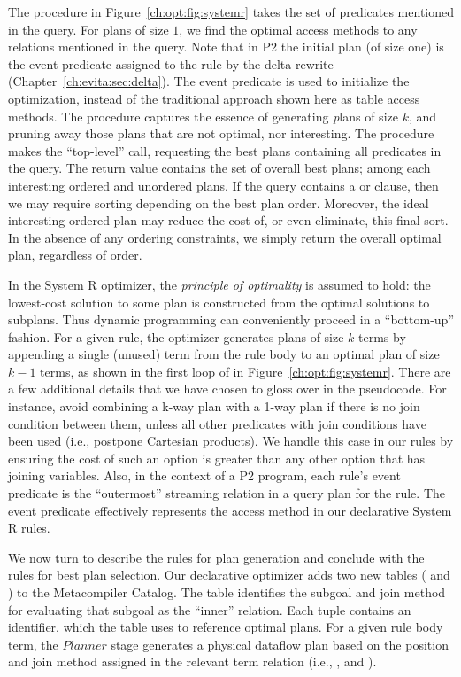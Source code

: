 The  procedure in Figure~\ref{ch:opt:fig:systemr} takes the set of
predicates mentioned in the query.  For plans of size $1$, we find the optimal
access methods to any relations mentioned in the query.  Note that in P2 the
initial plan (of size one) is the event predicate assigned to the rule by the
delta rewrite (Chapter~\ref{ch:evita:sec:delta}).  The event predicate is used
to initialize the optimization, instead of the traditional approach shown here
as table access methods.  The  procedure captures the essence of
generating {\emph plans} of size $k$, and pruning away those plans that are not
optimal, nor interesting.  The  procedure makes the ``top-level''
call, requesting the best plans containing all predicates in the query.  The
return value contains the set of overall best plans; among each interesting
ordered and unordered plans.  If the query contains a  or
 clause, then we may require sorting depending on the best plan
order.  Moreover, the ideal interesting ordered plan may reduce the cost of, or
even eliminate, this final sort.  In the absence of any ordering constraints,
we simply return the overall optimal plan, regardless of order.

In the System R optimizer, the {\em principle of optimality} is assumed to
hold: the lowest-cost solution to some plan is constructed from the optimal
solutions to subplans.  Thus dynamic programming can conveniently proceed in a
``bottom-up'' fashion.  For a given rule, the optimizer generates plans of size
$k$ terms by appending a single (unused) term from the rule body to an optimal
plan of size $k-1$ terms, as shown in the first loop of  in
Figure~\ref{ch:opt:fig:systemr}.  There are a few additional details that we
have chosen to gloss over in the pseudocode.  For instance, avoid combining a
k-way plan with a 1-way plan if there is no join condition between them, unless
all other predicates with join conditions have been used (i.e., postpone
Cartesian products).  We handle this case in our \OVERLOG rules by ensuring the
cost of such an option is greater than any other option that has joining
variables.  Also, in the context of a P2 program, each rule's event predicate
is the ``outermost'' streaming relation in a query plan for the rule.  The
event predicate effectively represents the access method in our declarative
System R rules.

We now turn to describe the \OVERLOG rules for plan generation and conclude
with the rules for best plan selection.  Our declarative optimizer adds two new
tables ( and ) to the Metacompiler Catalog.  The
 table identifies the subgoal and join method for evaluating that
subgoal as the ``inner'' relation.  Each  tuple contains an
identifier, which the  table uses to reference optimal plans.  For
a given rule body term, the $Planner$ stage generates a physical dataflow plan
based on the position and join method assigned in the relevant term relation
(i.e., ,  and ).

